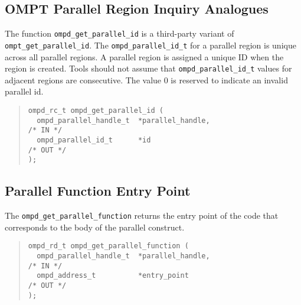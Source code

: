 \subsection{OMPT Parallel Region Inquiry Analogues}

The function \verb|ompd_get_parallel_id| is a third-party variant of
\verb|ompt_get_parallel_id|.
The \verb|ompd_parallel_id_t| for a parallel region is unique across
all parallel regions.
A parallel region is assigned a unique ID when the region is created.
Tools should not assume that \verb|ompd_parallel_id_t| values for
adjacent regions are consecutive.  
The value 0 is reserved to indicate an invalid parallel id.

\begin{quote}
\begin{lstlisting}
ompd_rc_t ompd_get_parallel_id (
  ompd_parallel_handle_t  *parallel_handle,                         /* IN */
  ompd_parallel_id_t      *id                                      /* OUT */
);
\end{lstlisting}
\end{quote}

\subsection{Parallel Function Entry Point}

The \texttt{ompd\_get\_parallel\_function} returns the
entry point of the code that corresponds to the body of
the parallel construct.

\begin{quote}
\begin{lstlisting}
ompd_rd_t ompd_get_parallel_function (
  ompd_parallel_handle_t  *parallel_handle,                         /* IN */
  ompd_address_t          *entry_point                             /* OUT */
);
\end{lstlisting}
\end{quote}
